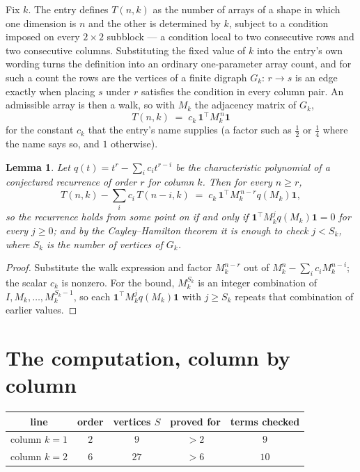 \documentclass[11pt,a4paper]{article}
\theoremstyle{plain}
\newtheorem{lemma}[theorem]{Lemma}
\theoremstyle{definition}
\begin{document}
Fix $k$. The entry defines $T(n,k)$ as the number of arrays of a shape in which one dimension
is $n$ and the other is determined by $k$, subject to a condition imposed on every
$2\times2$ subblock --- a condition local to two consecutive rows and two consecutive columns.
Substituting the fixed value of $k$ into the entry's own wording turns the definition into an
ordinary one-parameter array count, and for such a count the rows are the vertices of a finite
digraph $G_k$: $r\to s$ is an edge exactly when placing $s$ under $r$ satisfies the condition
in every column pair. An admissible array is then a walk, so with $M_k$ the adjacency matrix
of $G_k$,
\[
T(n,k)\;=\;c_k\,\mathbf{1}^{\!\top}M_k^{\,n}\mathbf{1}
\]
for the constant $c_k$ that the entry's name supplies (a factor such as $\tfrac12$ or
$\tfrac14$ where the name says so, and $1$ otherwise).

\begin{lemma}\label{lem:crit}
Let $q(t)=t^{r}-\sum_i c_it^{r-i}$ be the characteristic polynomial of a conjectured
recurrence of order $r$ for column $k$. Then for every $n\ge r$,
\[
T(n,k)-\sum_i c_i\,T(n-i,k)\;=\;c_k\,\mathbf{1}^{\!\top}M_k^{\,n-r}q(M_k)\mathbf{1},
\]
so the recurrence holds from some point on if and only if
$\mathbf{1}^{\!\top}M_k^{j}q(M_k)\mathbf{1}=0$ for every $j\ge0$; and by the
Cayley--Hamilton theorem it is enough to check $j<S_k$, where $S_k$ is the number of vertices
of $G_k$.
\end{lemma}

\begin{proof}
Substitute the walk expression and factor $M_k^{n-r}$ out of $M_k^{n}-\sum_ic_iM_k^{n-i}$;
the scalar $c_k$ is nonzero. For the bound, $M_k^{S_k}$ is an integer combination of
$I,M_k,\dots,M_k^{S_k-1}$, so each $\mathbf{1}^{\!\top}M_k^{j}q(M_k)\mathbf{1}$ with
$j\ge S_k$ repeats that combination of earlier values.
\end{proof}

\section{The computation, column by column}

\begin{center}
\begin{tabular}{ccccc}
line & order & vertices $S$ & proved for & terms checked \\ \hline
column $k$$=1$ & $2$ & $9$ & $>2$ & $9$ \\
column $k$$=2$ & $6$ & $27$ & $>6$ & $10$ \\
\end{tabular}
\end{center}
\end{document}
